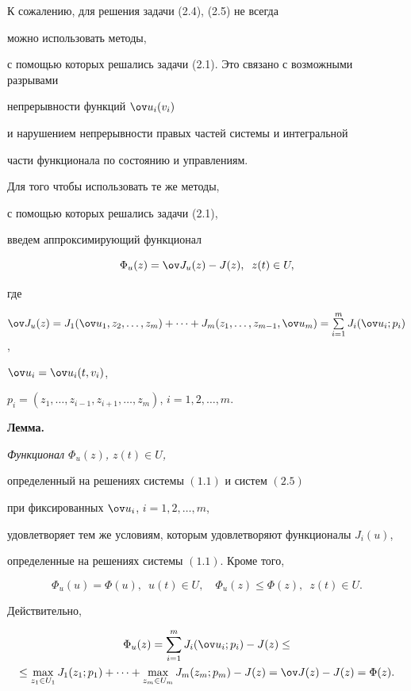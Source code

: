 К сожалению, для решения задачи (2.4), (2.5) не всегда 


можно использовать методы, 


с помощью которых решались задачи (2.1). Это связано с возможными разрывами 


непрерывности функций $\ov u_i(v_i)$


и нарушением непрерывности правых частей системы и интегральной 


части функционала по состоянию и управлениям.


Для того чтобы использовать те же методы, 


с помощью которых решались задачи (2.1),


введем аппроксимирующий функционал


\begin{equation}


\Phi_u(z)=\ov J_u(z)-J(z),\;\; z(t)\in U,


\end{equation}


где


$\ov J_u(z)=J_1(\ov u_1,z_2,\dotsc,z_m)+\dotsb+


J_m(z_1,\dotsc,z_{m-1},\ov u_m)=


\sum\limits_{i=1}^{m}J_i(\ov u_i;p_i)$,


$\ov u_i=\ov u_i(t,v_i)$,


$p_i=(z_1,\dotsc,z_{i-1},z_{i+1},\dotsc,z_m)$, $i=1,2,\dotsc, m$.


\medskip





{\bf Лемма.} {\it Функционал $\Phi_u(z)$, $z(t)\in U$,


определенный на решениях системы $(1.1)$ и систем $(2.5)$


при фиксированных $\ov u_i$, $i=1,2,\dotsc,m$,


удовлетворяет тем же условиям, которым удовлетворяют функционалы $J_i(u)$,


определенные на решениях системы $(1.1)$. Кроме того,


$$\Phi_u(u)=\Phi(u),\ \;u(t)\in U,\quad


\Phi_u(z)\leq\Phi(z),\ \; z(t)\in U.


$$


}





Действительно,


\begin{multline*}


\Phi_u(z)=\sum_{i=1}^{m}J_i(\ov u_i;p_i)-J(z)\leq \\


%


\leq \max_{{z_{1}\in U_1}}J_1(z_1;p_1)+\dotsb +\max_{{z_m\in U_m}}


J_m(z_m;p_m)-J(z)=\ov J(z)-J(z)=\Phi(z).


\end{multline*}



